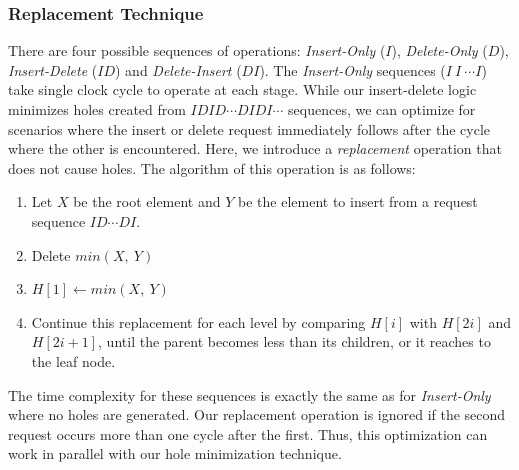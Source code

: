 \subsubsection{Replacement Technique}
 There are four possible sequences of operations: {\it Insert-Only} ($I$), {\it Delete-Only} ($D$), {\it Insert-Delete} ($ID$) and {\it Delete-Insert} ($DI$).
The {\it Insert-Only} sequences ($I \ I \ \cdots I $) take single clock cycle to operate at each stage.
While our insert-delete logic minimizes holes created from $IDID \cdots DIDI \cdots$ sequences, we can optimize for scenarios where the insert or delete request immediately follows after the cycle where the other is encountered.
Here, we introduce a {\it replacement} operation that does not cause holes.
The algorithm of this operation is as follows:
 \begin{enumerate}
 \item Let $X$ be the root element and $Y$ be the element to insert from a request sequence $ID \cdots DI$.
 \item Delete $min(X, \ Y)$
 \item $H[1] \leftarrow min(X,\ Y)$
 \item Continue this replacement for each level by comparing $H[i]$ with $H[2i]$ and $H[2i+1]$, until the parent becomes less than its children, or it reaches to the leaf node.
 \end{enumerate}
The time complexity for these sequences is exactly the same as for {\it Insert-Only} where no holes are generated.
Our replacement operation is ignored if the second request occurs more than one cycle after the first.
Thus, this optimization can work in parallel with our hole minimization technique.
